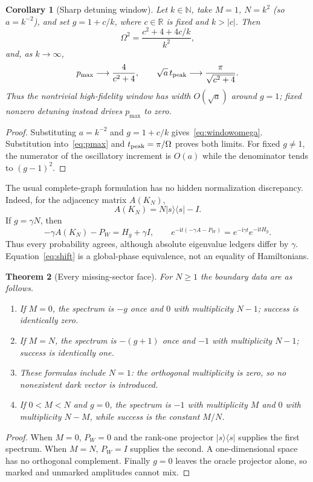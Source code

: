 \documentclass[10pt]{article}
\newtheorem{theorem}{Theorem}
\newtheorem{corollary}[theorem]{Corollary}
\newcommand{\ket}[1]{|#1\rangle}
\newcommand{\bra}[1]{\langle#1|}
\newcommand{\iu}{\mathrm{i}}
\begin{document}
\begin{corollary}[Sharp detuning window]\label{cor:window}
Let $k\in\mathbb N$, take $M=1$, $N=k^2$ (so $a=k^{-2}$), and set
$g=1+c/k$, where $c\in\mathbb R$ is fixed and $k>|c|$.
Then
\begin{equation}\label{eq:windowomega}
 \Omega^2=\frac{c^2+4+4c/k}{k^2},
\end{equation}
and, as $k\to\infty$,
\begin{equation}\label{eq:window}
 p_{\max}\longrightarrow\frac{4}{c^2+4},\qquad
 \sqrt a\,t_{\rm peak}\longrightarrow\frac{\pi}{\sqrt{c^2+4}}.
\end{equation}
Thus the nontrivial high-fidelity window has width $O(\sqrt a)$ around
$g=1$; fixed nonzero detuning instead drives $p_{\max}$ to zero.
\end{corollary}
\begin{proof}
Substituting $a=k^{-2}$ and $g=1+c/k$ gives~\eqref{eq:windowomega}.
Substitution into~\eqref{eq:pmax} and $t_{\rm peak}=\pi/\Omega$ proves both
limits.  For fixed $g\ne1$, the numerator of the oscillatory increment is
$O(a)$ while the denominator tends to $(g-1)^2$.
\end{proof}

The usual complete-graph formulation has no hidden normalization discrepancy.
Indeed, for the adjacency matrix $A(K_N)$,
\begin{equation}\label{eq:adjacency}
 A(K_N)=N\ket s\bra s-I.
\end{equation}
If $g=\gamma N$, then
\begin{equation}\label{eq:shift}
 -\gamma A(K_N)-P_W=H_g+\gamma I,
 \qquad
 e^{-\iu t(-\gamma A-P_W)}=e^{-\iu\gamma t}e^{-\iu tH_g}.
\end{equation}
Thus every probability agrees, although absolute eigenvalue ledgers differ by
$\gamma$.  Equation~\eqref{eq:shift} is a global-phase equivalence, not an
equality of Hamiltonians.

\begin{theorem}[Every missing-sector face]\label{thm:faces}
For $N\geq1$ the boundary data are as follows.
\begin{enumerate}
\item If $M=0$, the spectrum is $-g$ once and $0$ with multiplicity $N-1$;
success is identically zero.
\item If $M=N$, the spectrum is $-(g+1)$ once and $-1$ with multiplicity
$N-1$; success is identically one.
\item These formulas include $N=1$: the orthogonal multiplicity is zero, so
no nonexistent dark vector is introduced.
\item If $0<M<N$ and $g=0$, the spectrum is $-1$ with multiplicity $M$ and
$0$ with multiplicity $N-M$, while success is the constant $M/N$.
\end{enumerate}
\end{theorem}
\begin{proof}
When $M=0$, $P_W=0$ and the rank-one projector $\ket s\bra s$ supplies the
first spectrum.  When $M=N$, $P_W=I$ supplies the second.  A one-dimensional
space has no orthogonal complement.  Finally $g=0$ leaves the oracle
projector alone, so marked and unmarked amplitudes cannot mix.
\end{proof}
\fi
\end{document}
